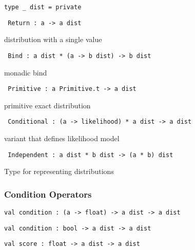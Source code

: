 \protect\hyperlink{type-dist}{}\texttt{type\ \_\ dist}\texttt{\ =\ private\ }

\protect\hyperlink{type-dist.Return}{}\texttt{\textbar{}\ }\texttt{Return\ :\ \textquotesingle{}a\ -\textgreater{}\ \textquotesingle{}a\ dist}

distribution with a single value

\protect\hyperlink{type-dist.Bind}{}\texttt{\textbar{}\ }\texttt{Bind\ :\ \textquotesingle{}a\ dist\ *\ (\textquotesingle{}a\ -\textgreater{}\ \textquotesingle{}b\ dist)\ -\textgreater{}\ \textquotesingle{}b\ dist}

monadic bind

\protect\hyperlink{type-dist.Primitive}{}\texttt{\textbar{}\ }\texttt{Primitive\ :\ \textquotesingle{}a\ Primitive.t\ -\textgreater{}\ \textquotesingle{}a\ dist}

primitive exact distribution

\protect\hyperlink{type-dist.Conditional}{}\texttt{\textbar{}\ }\texttt{Conditional\ :\ (\textquotesingle{}a\ -\textgreater{}\ likelihood)\ *\ \textquotesingle{}a\ dist\ -\textgreater{}\ \textquotesingle{}a\ dist}

variant that defines likelihood model

\protect\hyperlink{type-dist.Independent}{}\texttt{\textbar{}\ }\texttt{Independent\ :\ \textquotesingle{}a\ dist\ *\ \textquotesingle{}b\ dist\ -\textgreater{}\ (\textquotesingle{}a\ *\ \textquotesingle{}b)\ dist}

Type for representing distributions

\hypertarget{distux5fmonad}{\subsubsection{\texorpdfstring{\protect\hyperlink{distux5fmonad}{}Condition
Operators}{Condition Operators}}\label{distux5fmonad}}

\protect\hyperlink{val-conditionux27}{}\texttt{val\ condition\textquotesingle{}\ :\ (\textquotesingle{}a\ -\textgreater{}\ float)\ -\textgreater{}\ \textquotesingle{}a\ dist\ -\textgreater{}\ \textquotesingle{}a\ dist}

\protect\hyperlink{val-condition}{}\texttt{val\ condition\ :\ bool\ -\textgreater{}\ \textquotesingle{}a\ dist\ -\textgreater{}\ \textquotesingle{}a\ dist}

\protect\hyperlink{val-score}{}\texttt{val\ score\ :\ float\ -\textgreater{}\ \textquotesingle{}a\ dist\ -\textgreater{}\ \textquotesingle{}a\ dist}

